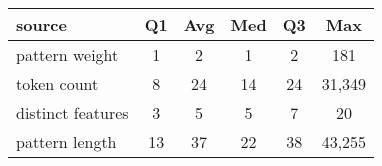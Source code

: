 \begin{center}
\begin{tabular}{l|ccccc}
\toprule
source & Q1 & Avg & Med & Q3 & Max \\ 
\midrule
pattern weight & 1 & 2 & 1 & 2 & 181 \\ 
\midrule
token count & 8 & 24 & 14 & 24 & 31,349 \\ 
\midrule
distinct features & 3 & 5 & 5 & 7 & 20 \\ 
\midrule
pattern length & 13 & 37 & 22 & 38 & 43,255 \\ 
\bottomrule
\end{tabular}
\end{center}
